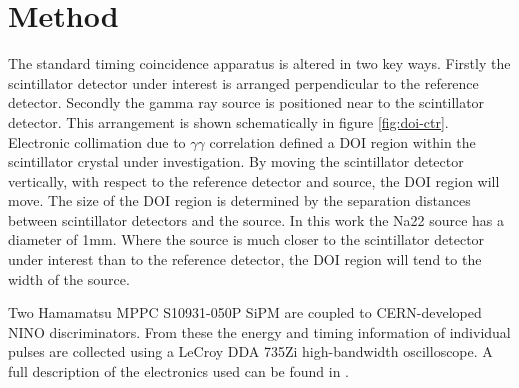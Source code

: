 \section{Method}
The standard timing coincidence apparatus is altered in two key ways. Firstly the scintillator detector under interest is arranged perpendicular to the reference detector. Secondly the gamma ray source is positioned near to the scintillator detector. This arrangement is shown schematically in figure \ref{fig:doi-ctr}. Electronic collimation due to $\gamma\gamma$ correlation defined a DOI region within the scintillator crystal under investigation. By moving the scintillator detector vertically, with respect to the reference detector and source, the DOI region will move. The size of the DOI region is determined by the separation distances between scintillator detectors and the source. In this work the Na22 source has a diameter of 1mm. Where the source is much closer to the scintillator detector under interest than to the reference detector, the DOI region will tend to the width of the source.

Two Hamamatsu MPPC S10931-050P SiPM are coupled to CERN-developed NINO discriminators. From these the energy and timing information of individual pulses are collected using a LeCroy DDA 735Zi high-bandwidth oscilloscope. A full description of the electronics used can be found in \cite{arron_Meyer_Pauwels_Lecoq_2012}.